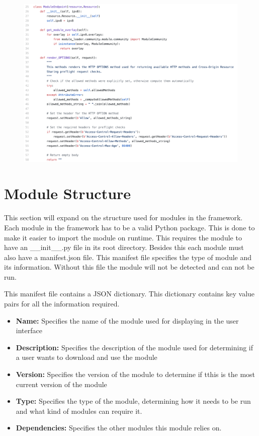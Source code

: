 \begin{figure}[h!]
	\centering
	\includegraphics[width=\textwidth]{images/code-rest-cors.png}
	\caption{\label{fig:rest-cors}}
\end{figure}



\section{Module Structure}

This section will expand on the structure used for modules in the framework. Each module in the framework has to be a valid Python package. This is done to make it easier to import the module on runtime. This requires the module to have an \_\_init\_\_.py file in its root directory. Besides this each module must also have a manifest.json file. This manifest file specifies the type of module and its information. Without this file the module will not be detected and can not be run.

This manifest file contains a JSON dictionary. This dictionary contains key value pairs for all the information required.

\begin{itemize}
	\item \textbf{Name:} Specifies the name of the module used for displaying in the user interface
	\item \textbf{Description:} Specifies the description of the module used for determining if a user wants to download and use the module 
	\item \textbf{Version:} Specifies the version of the module to determine if tthis is the most current version of the module
	\item \textbf{Type:} Specifies the type of the module, determining how it needs to be run and what kind of modules can require it.
	\item \textbf{Dependencies:} Specifies the other modules this module relies on.
\end{itemize}


